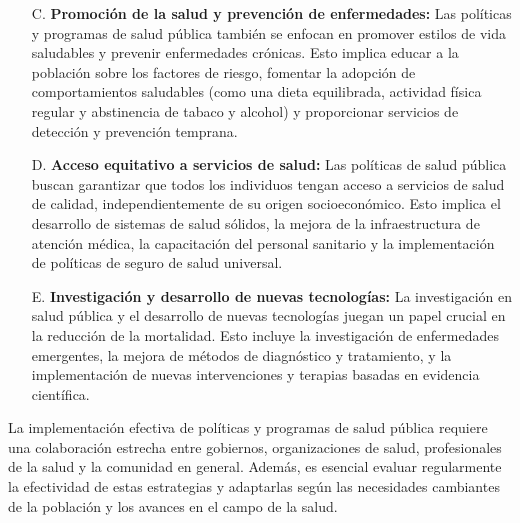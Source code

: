 \documentclass[8pt,a4paper]{beamer}
\begin{document}
{\begin{frame}{}
\begin{block}{}
\setlength{\parskip}{3px}
\justifying
\begin{enumerate}
\setlength{\parskip}{3px}
\justifying
\item[C.] \textbf{Promoción de la salud y prevención de enfermedades:} Las políticas y programas de salud pública también se enfocan en promover estilos de vida saludables y prevenir enfermedades crónicas. Esto implica educar a la población sobre los factores de riesgo, fomentar la adopción de comportamientos saludables (como una dieta equilibrada, actividad física regular y abstinencia de tabaco y alcohol) y proporcionar servicios de detección y prevención temprana.

\item[D.] \textbf{Acceso equitativo a servicios de salud:} Las políticas de salud pública buscan garantizar que todos los individuos tengan acceso a servicios de salud de calidad, independientemente de su origen socioeconómico. Esto implica el desarrollo de sistemas de salud sólidos, la mejora de la infraestructura de atención médica, la capacitación del personal sanitario y la implementación de políticas de seguro de salud universal.
\end{enumerate}
\end{block}
\end{frame}

\begin{frame}{}
\begin{block}{}
\setlength{\parskip}{3px}
\justifying
\begin{enumerate}
\setlength{\parskip}{3px}
\justifying
\item[E.] \textbf{Investigación y desarrollo de nuevas tecnologías: }La investigación en salud pública y el desarrollo de nuevas tecnologías juegan un papel crucial en la reducción de la mortalidad. Esto incluye la investigación de enfermedades emergentes, la mejora de métodos de diagnóstico y tratamiento, y la implementación de nuevas intervenciones y terapias basadas en evidencia científica.
\end{enumerate}
La implementación efectiva de políticas y programas de salud pública requiere una colaboración estrecha entre gobiernos, organizaciones de salud, profesionales de la salud y la comunidad en general. Además, es esencial evaluar regularmente la efectividad de estas estrategias y adaptarlas según las necesidades cambiantes de la población y los avances en el campo de la salud.
\end{block}
\end{frame}

}
\end{document}
